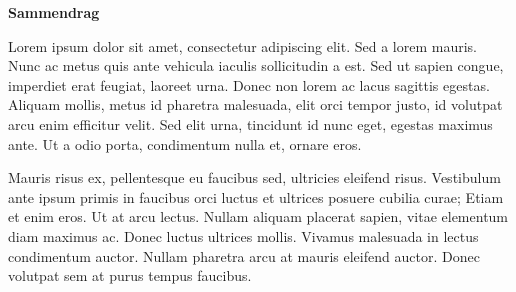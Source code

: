 \documentclass[
  12pt,
  a4paper,
  DIV=11,
  numbers=noendperiod]{scrartcl}
\begin{document}






\thispagestyle{plain}
\begin{center}
    \Large
    \textbf{Sammendrag}
\end{center}

Lorem ipsum dolor sit amet, consectetur adipiscing elit. Sed a lorem mauris. Nunc ac metus quis ante vehicula iaculis sollicitudin a est. Sed ut sapien congue, imperdiet erat feugiat, laoreet urna. Donec non lorem ac lacus sagittis egestas. Aliquam mollis, metus id pharetra malesuada, elit orci tempor justo, id volutpat arcu enim efficitur velit. Sed elit urna, tincidunt id nunc eget, egestas maximus ante. Ut a odio porta, condimentum nulla et, ornare eros.

Mauris risus ex, pellentesque eu faucibus sed, ultricies eleifend risus. Vestibulum ante ipsum primis in faucibus orci luctus et ultrices posuere cubilia curae; Etiam et enim eros. Ut at arcu lectus. Nullam aliquam placerat sapien, vitae elementum diam maximus ac. Donec luctus ultrices mollis. Vivamus malesuada in lectus condimentum auctor. Nullam pharetra arcu at mauris eleifend auctor. Donec volutpat sem at purus tempus faucibus.
\end{document}
